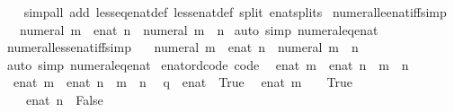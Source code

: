 \begin{isabellebody}
%
\isadelimproof
\ \ %
\endisadelimproof
%
\isatagproof
{}\isamarkupfalse%
\ {\isacharparenleft}simp{\isacharunderscore}all\ add{\isacharcolon}\ less{\isacharunderscore}eq{\isacharunderscore}enat{\isacharunderscore}def\ less{\isacharunderscore}enat{\isacharunderscore}def\ split{\isacharcolon}\ enat{\isachardot}splits{\isacharparenright}%
\endisatagproof
{\isafoldproof}%
%
\isadelimproof
\isanewline
%
\endisadelimproof
\isanewline
{}\isamarkupfalse%
\ numeral{\isacharunderscore}le{\isacharunderscore}enat{\isacharunderscore}iff{\isacharbrackleft}simp{\isacharbrackright}{\isacharcolon}\isanewline
\ \ \ {\isachardoublequoteopen}numeral\ m\ {\isasymle}\ enat\ n\ {\isasymlongleftrightarrow}\ numeral\ m\ {\isasymle}\ n{\isachardoublequoteclose}\isanewline
%
\isadelimproof
%
\endisadelimproof
%
\isatagproof
{}\isamarkupfalse%
\ {\isacharparenleft}auto\ simp{\isacharcolon}\ numeral{\isacharunderscore}eq{\isacharunderscore}enat{\isacharparenright}%
\endisatagproof
{\isafoldproof}%
%
\isadelimproof
\isanewline
%
\endisadelimproof
\isanewline
{}\isamarkupfalse%
\ numeral{\isacharunderscore}less{\isacharunderscore}enat{\isacharunderscore}iff{\isacharbrackleft}simp{\isacharbrackright}{\isacharcolon}\isanewline
\ \ \ {\isachardoublequoteopen}numeral\ m\ {\isacharless}\ enat\ n\ {\isasymlongleftrightarrow}\ numeral\ m\ {\isacharless}\ n{\isachardoublequoteclose}\isanewline
%
\isadelimproof
%
\endisadelimproof
%
\isatagproof
{}\isamarkupfalse%
\ {\isacharparenleft}auto\ simp{\isacharcolon}\ numeral{\isacharunderscore}eq{\isacharunderscore}enat{\isacharparenright}%
\endisatagproof
{\isafoldproof}%
%
\isadelimproof
\isanewline
%
\endisadelimproof
\isanewline
{}\isamarkupfalse%
\ enat{\isacharunderscore}ord{\isacharunderscore}code\ {\isacharbrackleft}code{\isacharbrackright}{\isacharcolon}\isanewline
\ \ {\isachardoublequoteopen}enat\ m\ {\isasymle}\ enat\ n\ {\isasymlongleftrightarrow}\ m\ {\isasymle}\ n{\isachardoublequoteclose}\isanewline
\ \ {\isachardoublequoteopen}enat\ m\ {\isacharless}\ enat\ n\ {\isasymlongleftrightarrow}\ m\ {\isacharless}\ n{\isachardoublequoteclose}\isanewline
\ \ {\isachardoublequoteopen}q\ {\isasymle}\ {\isacharparenleft}{\isasyminfinity}{\isacharcolon}{\isacharcolon}enat{\isacharparenright}\ {\isasymlongleftrightarrow}\ True{\isachardoublequoteclose}\isanewline
\ \ {\isachardoublequoteopen}enat\ m\ {\isacharless}\ {\isasyminfinity}\ {\isasymlongleftrightarrow}\ True{\isachardoublequoteclose}\isanewline
\ \ {\isachardoublequoteopen}{\isasyminfinity}\ {\isasymle}\ enat\ n\ {\isasymlongleftrightarrow}\ False{\isachardoublequoteclose}\isanewline

\end{isabellebody}
